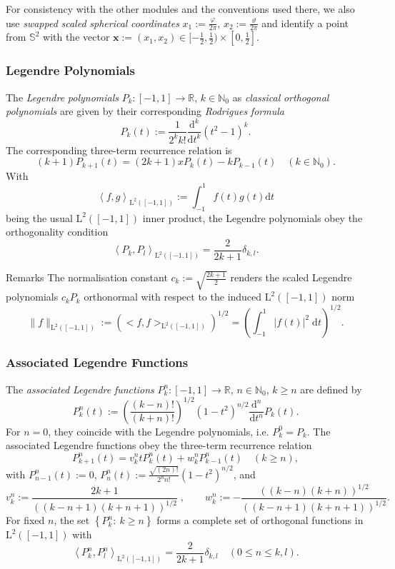 For consistency with the other modules and the conventions used there, we also use {\itshape swapped} {\itshape scaled} {\itshape spherical} {\itshape coordinates} $x_1 := \frac{\varphi}{2\pi}$, $x_2 := \frac{\vartheta}{2\pi}$ and identify a point from $\mathbb{S}^2$ with the vector $\mathbf{x} := \left(x_1,x_2\right) \in [-\frac{1}{2}, \frac{1}{2}) \times [0,\frac{1}{2}]$.\hypertarget{group__nfsft_lp}{}\subsubsection{Legendre Polynomials}\label{group__nfsft_lp}
The {\itshape Legendre} {\itshape polynomials} $P_k : [-1,1] \rightarrow \mathbb{R}$, $k \in \mathbb{N}_{0}$ as {\itshape classical} {\itshape orthogonal} {\itshape polynomials} are given by their corresponding {\itshape Rodrigues} {\itshape formula} \[ P_k(t) := \frac{1}{2^k k!} \frac{\text{d}^k}{\text{d} t^k} \left(t^2-1\right)^k. \] The corresponding three-\/term recurrence relation is \[ (k+1)P_{k+1}(t) = (2k+1) x P_{k}(t) - k P_{k-1}(t) \quad (k \in \mathbb{N}_0). \] With \[ \left< f,g \right>_{\text{L}^2\left([-1,1]\right)} := \int_{-1}^{1} f(t) g(t) \text{d} t \] being the usual $\text{L}^2\left([-1,1]\right)$ inner product, the Legendre polynomials obey the orthogonality condition \[ \left< P_k,P_l \right>_{\text{L}^2\left([-1,1]\right)} = \frac{2}{2k+1} \delta_{k,l}. \]

\begin{DoxyRemark}{Remarks}
The normalisation constant $ c_k := \sqrt{\frac{2k+1}{2}}$ renders the scaled Legendre polynomials $c_k P_k$ orthonormal with respect to the induced $\text{L}^2\left([-1,1]\right)$ norm \[ \|f\|_{\text{L}^2\left([-1,1]\right)} := \left(<f,f>_{\text{L}^2\left([-1,1]\right)}\right)^{1/2} = \left(\int_{-1}^{1} |f(t)|^2 \; \text{d} t\right)^{1/2}. \]
\end{DoxyRemark}
\hypertarget{group__nfsft_alf}{}\subsubsection{Associated Legendre Functions}\label{group__nfsft_alf}
The {\itshape associated} {\itshape Legendre} {\itshape functions} $P_k^n : [-1,1] \rightarrow \mathbb{R} $, $n \in \mathbb{N}_0$, $k \ge n$ are defined by \[ P_k^n(t) := \left(\frac{(k-n)!}{(k+n)!}\right)^{1/2} \left(1-t^2\right)^{n/2} \frac{\text{d}^n}{\text{d} t^n} P_k(t). \] For $n = 0$, they coincide with the Legendre polynomials, i.\-e. $P_k^0 = P_k$. The associated Legendre functions obey the three-\/term recurrence relation \[ P_{k+1}^n(t) = v_{k}^n t P_k^n(t) + w_{k}^n P_{k-1}^n(t) \quad (k \ge n), \] with $P_{n-1}^n(t) := 0$, $P_{n}^n(t) := \frac{\sqrt{(2n)!}}{2^n n!} \left(1-t^2\right)^{n/2}$, and \[ v_{k}^n := \frac{2k+1}{((k-n+1)(k+n+1))^{1/2}}\; ,\qquad w_{k}^n := - \frac{((k-n)(k+n))^{1/2}}{((k-n+1)(k+n+1))^{1/2}}. \] For fixed $n$, the set $\left\{P_k^n:\: k \ge n\right\}$ forms a complete set of orthogonal functions in $\text{L}^2\left([-1,1]\right)$ with \[ \left< P_k^n,P_l^n \right>_{\text{L}^2\left([-1,1]\right)} = \frac{2}{2k+1} \delta_{k,l} \quad (0 \le n \le k,l). \]

